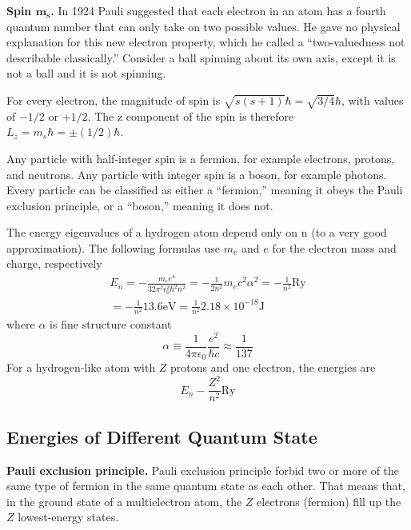 \documentclass[../main.tex]{subfiles}
\begin{document}
\textbf{Spin $\boldsymbol{m_s}$.} In 1924 Pauli suggested that each electron in an atom has a fourth quantum number that can only take on two possible values. He gave no physical explanation for this new electron property, which he called a “two-valuedness not describable classically.” Consider a ball spinning about its own axis, except it is not a ball and it is not spinning.

For every electron, the magnitude of spin is $\sqrt{s(s + 1)}\hbar=\sqrt{3/4}\hbar$, with values of $-1/2$ or $+1/2$. The z component of the spin is therefore $L_z= m_s\hbar=\pm(1/2)\hbar$.

Any particle with half-integer spin is a fermion, for example electrons, protons, and neutrons. Any particle with integer spin is a boson, for example photons. Every particle can be classified as either a “fermion,” meaning it obeys the Pauli exclusion principle, or a “boson,” meaning it does not. 

The energy eigenvalues of a hydrogen atom depend only on n (to a very good approximation). The  following formulas use $m_e$ and $e$ for the electron mass and charge, respectively
\begin{multline*}
    E_n=-\frac{m_ee^4}{32\pi^2\epsilon_0^2
    \hbar^2n^2}=-\frac{1}{2n^2}m_ec^2\alpha^2 = -\frac{1}{n^2}\text{Ry}\\
    = -\frac{1}{n^2}13.6 \text{eV}=\frac{1}{n^2}2.18\times 10^{-18}\text{J}
\end{multline*}
where $\alpha$ is fine structure constant
\begin{equation*}
    \alpha \equiv \frac{1}{4\pi\epsilon_0}\frac{e^2}{\hbar c}\approx \frac{1}{137}
\end{equation*}
For a hydrogen-like atom with $Z$ protons and one electron, the energies are
\begin{equation*}
    E_n-\frac{Z^2}{n^2}\text{Ry}
\end{equation*}

\subsection*{Energies of Different Quantum State}
\textbf{Pauli exclusion principle.} Pauli exclusion principle forbid two or more of the same type of fermion in the same quantum state as each other. That means that, in the ground state of a multielectron atom, the $Z$ electrons (fermion) fill up the $Z$ lowest-energy states.
\end{document}
